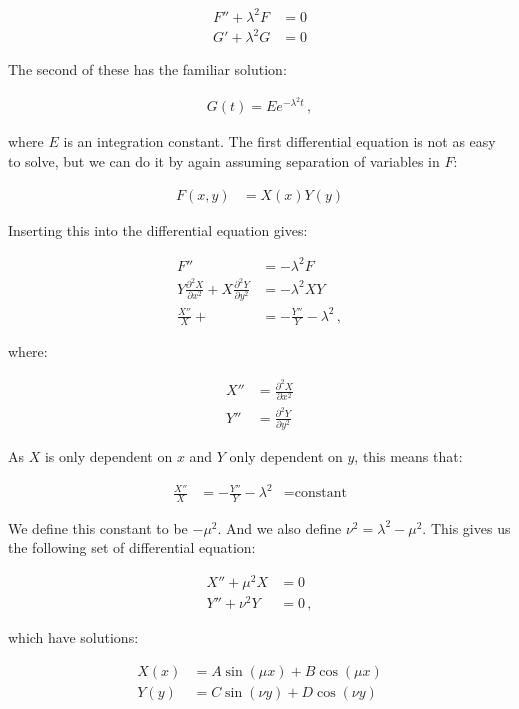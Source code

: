 \documentclass[reprint,english,notitlepage]{revtex4-1}  %
\begin{document}
\begin{align*}
F'' + \lambda^2 F &= 0 \\
G' + \lambda^2 G &= 0
\end{align*}

The second of these has the familiar solution:

\begin{align*}
G(t) = Ee^{-\lambda^2 t} \, ,
\end{align*}

where $E$ is an integration constant. The first differential equation is not as easy to solve, but we can do it by again assuming separation of variables in $F$:

\begin{align*}
F(x,y) &= X(x) Y(y)
\end{align*}

Inserting this into the differential equation gives:

\begin{align*}
F'' &= -\lambda^2 F \\
Y \frac{\partial^2 X}{\partial x^2} + X \frac{\partial^2 Y}{\partial y^2} &= -\lambda^2 XY \\
\frac{X''}{X} +  &= - \frac{Y''}{Y} - \lambda^2 \, ,
\end{align*}

where:

\begin{align*}
X'' &= \frac{\partial^2 X}{\partial x^2} \\
Y'' &= \frac{\partial^2 Y}{\partial y^2}
\end{align*}

As $X$ is only dependent on $x$ and $Y$ only dependent on $y$, this means that:

\begin{align*}
\frac{X''}{X} &= - \frac{Y''}{Y} - \lambda^2 &= \text{constant}
\end{align*}

We define this constant to be $-\mu^2$. And we also define $\nu^2 = \lambda^2 - \mu^2$. This gives us the following set of differential equation:

\begin{align*}
X'' + \mu^2 X &= 0 \\
Y'' + \nu^2 Y &= 0 \, ,
\end{align*}  

which have solutions:

\begin{align*}
X(x) &= A \sin(\mu x) + B\cos(\mu x) \\
Y(y) &= C \sin (\nu y) + D \cos (\nu y)
\end{align*}
\end{document}
